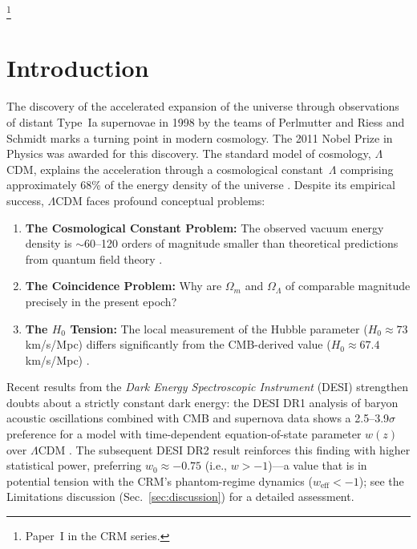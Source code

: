 \documentclass[aps,prd,twocolumn,superscriptaddress,nofootinbib]{revtex4-2}
\begin{document}
\thanks{Paper~I in the CRM series.}

\maketitle


\section{Introduction}
\label{sec:introduction}

The discovery of the accelerated expansion of the universe through observations of distant Type~Ia supernovae in 1998 by the teams of Perlmutter \cite{Perlmutter1999} and Riess and Schmidt \cite{Riess1998} marks a turning point in modern cosmology. The 2011 Nobel Prize in Physics was awarded for this discovery. The standard model of cosmology, $\Lambda$CDM, explains the acceleration through a cosmological constant~$\Lambda$ comprising approximately 68\% of the energy density of the universe \cite{Planck2020}. Despite its empirical success, $\Lambda$CDM faces profound conceptual problems:

\begin{enumerate}
\item \textbf{The Cosmological Constant Problem:} The observed vacuum energy density is $\sim$60--120 orders of magnitude smaller than theoretical predictions from quantum field theory \cite{Weinberg1989}.
\item \textbf{The Coincidence Problem:} Why are $\Omega_m$ and $\Omega_\Lambda$ of comparable magnitude precisely in the present epoch?
\item \textbf{The $H_0$ Tension:} The local measurement of the Hubble parameter ($H_0 \approx 73$\,km/s/Mpc) differs significantly from the CMB-derived value ($H_0 \approx 67.4$\,km/s/Mpc) \cite{Planck2020, Riess2022}.
\end{enumerate}

Recent results from the \textit{Dark Energy Spectroscopic Instrument} (DESI) strengthen doubts about a strictly constant dark energy: the DESI DR1 analysis of baryon acoustic oscillations combined with CMB and supernova data shows a 2.5--3.9$\sigma$ preference for a model with time-dependent equation-of-state parameter $w(z)$ over $\Lambda$CDM \cite{DESI2024}. The subsequent DESI DR2 result \cite{DESI2025} reinforces this finding with higher statistical power, preferring $w_0 \approx -0.75$ (i.e., $w > -1$)---a value that is in potential tension with the CRM's phantom-regime dynamics ($w_\mathrm{eff} < -1$); see the Limitations discussion (Sec.~\ref{sec:discussion}) for a detailed assessment.
\end{document}
